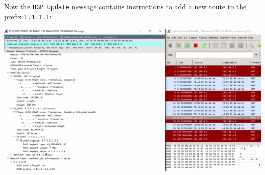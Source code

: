 \subsection{}
Now the \texttt{BGP Update} message contains instructions to add a new route to the prefix
\texttt{1.1.1.1}:
\begin{center}
    \includegraphics[width=1.2 \textwidth]{resources/q4-9.png}\centering
\end{center}
